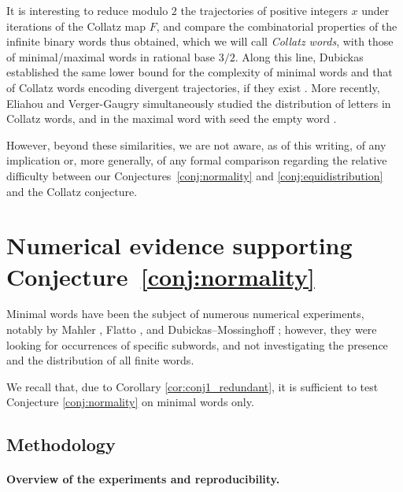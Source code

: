 \documentclass{template_arxiv}
\numberwithin{equation}{section}
\begin{document}
It is interesting to reduce modulo $2$ the trajectories of positive integers $x$ under iterations of the Collatz map $F$, and compare the combinatorial properties of the infinite binary words thus obtained, which we will call \emph{Collatz words}, with those of minimal/maximal words in rational base $3/2$. Along this line, Dubickas established the same lower bound for the complexity of minimal words and that of Collatz words encoding divergent trajectories, if they exist \cite[Corollary~4 and Theorem~5]{Dub09}. More recently, Eliahou and Verger-Gaugry simultaneously studied the distribution of letters in Collatz words, and in the maximal word with seed the empty word \cite[Conjectures~5 and 18]{EVG25}. 

However, beyond these similarities, we are not aware, as of this writing, of any implication or, more generally, of any formal comparison regarding the relative difficulty between our Conjectures~\ref{conj:normality} and \ref{conj:equidistribution} and the Collatz conjecture. 














\section{Numerical evidence supporting Conjecture~\ref{conj:normality}}\label{sect:numerical_evidence}
 

Minimal words have been the subject of numerous numerical experiments, notably by Mahler \cite{Mah68}, Flatto \cite{Fla92}, and Dubickas--Mossinghoff \cite{DM09}; however, they were looking for occurrences of specific subwords, and not investigating the presence and the distribution of all finite words.

\medskip

We recall that, due to Corollary \ref{cor:conj1_redundant}, it is sufficient to test Conjecture \ref{conj:normality} on minimal words only.

\subsection{Methodology}

\paragraph{Overview of the experiments and reproducibility.}
\end{document}
